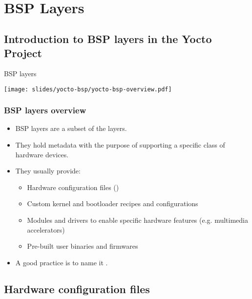 \section{BSP Layers}

\subsection{Introduction to BSP layers in the Yocto Project}

\begin{frame}{BSP layers}
  \begin{center}
    \texttt{[image: slides/yocto-bsp/yocto-bsp-overview.pdf]}
  \end{center}
\end{frame}

\begin{frame}
  \frametitle{BSP layers overview}
  \begin{itemize}
  \item BSP layers are a subset of the layers.
  \item They hold metadata with the purpose of supporting a specific class
    of hardware devices.
    \item They usually provide:
      \begin{itemize}
        \item Hardware configuration files ()
        \item Custom kernel and bootloader recipes and configurations
        \item Modules and drivers to enable specific hardware features
          (e.g. multimedia accelerators)
        \item Pre-built user binaries and firmwares
      \end{itemize}
    \item A good practice is to name it .
  \end{itemize}
\end{frame}

\subsection{Hardware configuration files}

